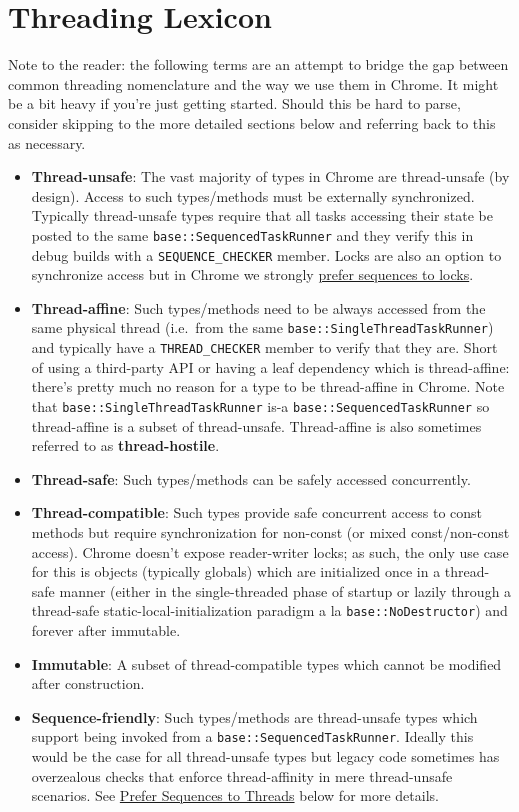 \documentclass[a4paper,12pt,notitlepage,twoside,openright]{article}
\begin{document}
\hypertarget{threading-lexicon}{%
\section{Threading Lexicon}\label{threading-lexicon}}

Note to the reader: the following terms are an attempt to bridge the gap
between common threading nomenclature and the way we use them in Chrome.
It might be a bit heavy if you're just getting started. Should this be
hard to parse, consider skipping to the more detailed sections below and
referring back to this as necessary.

\begin{itemize}
\item
  \textbf{Thread-unsafe}: The vast majority of types in Chrome are
  thread-unsafe (by design). Access to such types/methods must be
  externally synchronized. Typically thread-unsafe types require that
  all tasks accessing their state be posted to the same
  \texttt{base::SequencedTaskRunner} and they verify this in debug
  builds with a \texttt{SEQUENCE\_CHECKER} member. Locks are also an
  option to synchronize access but in Chrome we strongly
  \protect\hyperlink{Using-Sequences-Instead-of-Locks}{prefer sequences
  to locks}.
\item
  \textbf{Thread-affine}: Such types/methods need to be always accessed
  from the same physical thread (i.e.~from the same
  \texttt{base::SingleThreadTaskRunner}) and typically have a
  \texttt{THREAD\_CHECKER} member to verify that they are. Short of
  using a third-party API or having a leaf dependency which is
  thread-affine: there's pretty much no reason for a type to be
  thread-affine in Chrome. Note that
  \texttt{base::SingleThreadTaskRunner} is-a
  \texttt{base::SequencedTaskRunner} so thread-affine is a subset of
  thread-unsafe. Thread-affine is also sometimes referred to as
  \textbf{thread-hostile}.
\item
  \textbf{Thread-safe}: Such types/methods can be safely accessed
  concurrently.
\item
  \textbf{Thread-compatible}: Such types provide safe concurrent access
  to const methods but require synchronization for non-const (or mixed
  const/non-const access). Chrome doesn't expose reader-writer locks; as
  such, the only use case for this is objects (typically globals) which
  are initialized once in a thread-safe manner (either in the
  single-threaded phase of startup or lazily through a thread-safe
  static-local-initialization paradigm a la \texttt{base::NoDestructor})
  and forever after immutable.
\item
  \textbf{Immutable}: A subset of thread-compatible types which cannot
  be modified after construction.
\item
  \textbf{Sequence-friendly}: Such types/methods are thread-unsafe types
  which support being invoked from a \texttt{base::SequencedTaskRunner}.
  Ideally this would be the case for all thread-unsafe types but legacy
  code sometimes has overzealous checks that enforce thread-affinity in
  mere thread-unsafe scenarios. See
  \protect\hyperlink{prefer-sequences-to-physical-threads}{Prefer
  Sequences to Threads} below for more details.
\end{itemize}
\end{document}

